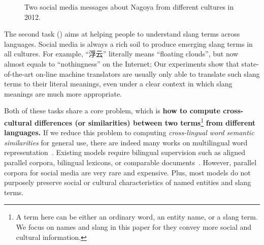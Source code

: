 \begin{figure}[t]
	\centering
	\caption{\small Two social media messages about Nagoya from different cultures in 2012. \vspace{-15pt}}
	\label{fig:intro}
\end{figure}

The second task () aims at helping people to understand slang terms across languages. 
Social media is always a rich soil to produce emerging slang 
terms in all cultures. 
For example, ``浮云'' literally means ``floating clouds'', 
but now almost equals to ``nothingness'' on the Internet; 
Our experiments show that state-of-the-art on-line machine translators are usually
only able to translate such slang terms to their literal meanings, 
even under a clear context in which slang meanings are much more appropriate.

Both of these tasks share a core problem, which is \textbf{how to compute 
cross-cultural differences (or similarities) between two terms}\footnote{{A term here can be either an ordinary word, an entity name, or a slang term. We focus on names and slang in this paper for they convey more social and cultural information.}}\textbf{ from 
different languages.} 
If we reduce this problem to computing \textit{cross-lingual word semantic similarities}\cite{CamachoCollados2017SemEval2017T2} for general use, 
there are indeed many works on multilingual word representation~\cite{DBLP:journals/corr/Ruder17}. 
Existing models require bilingual supervision such as
aligned parallel corpora, bilingual lexicons, or 
comparable documents~\cite{upadhyay2016cross}.
However, parallel corpora for social media are very rare and expensive. 
Plus, most models do not purposely preserve 
social or cultural characteristics of named entities and slang terms.

